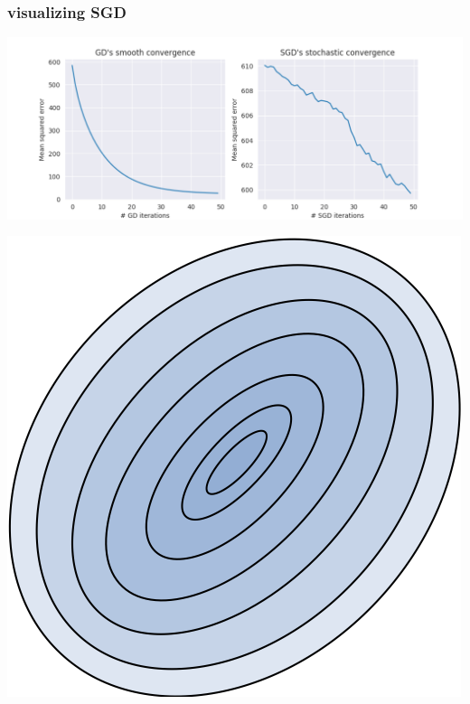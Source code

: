 \documentclass[compress]{beamer}
\begin{document}
\begin{frame}[t]
	\frametitle{visualizing SGD}
	\begin{center}
		\includegraphics[height=.35\textheight]{gd_convergence.png}
		
		\includegraphics[height=.5\textheight]{gd_paths_raw.png}
	\end{center}	
\end{frame}
\end{document}
